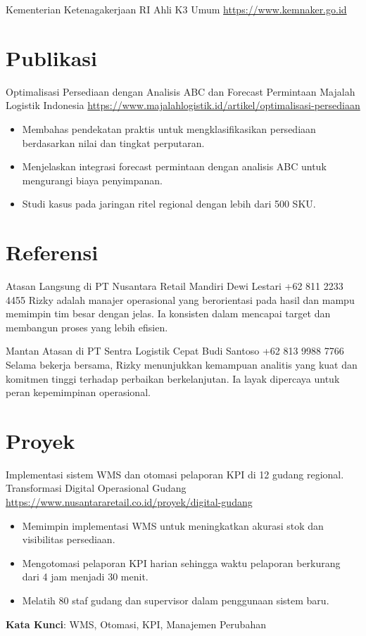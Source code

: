 \documentclass[a4paper, serif, 10pt]{moderncv}
\begin{document}
        {Kementerian Ketenagakerjaan RI}
        {Ahli K3 Umum}
        {\url{https://www.kemnaker.go.id}}
        {}
        {}
\section{Publikasi}

        {Optimalisasi Persediaan dengan Analisis ABC dan Forecast Permintaan}
        {Majalah Logistik Indonesia}
        {\url{https://www.majalahlogistik.id/artikel/optimalisasi-persediaan}}
        {}
        {\begin{itemize}
\item Membahas pendekatan praktis untuk mengklasifikasikan persediaan berdasarkan nilai dan tingkat perputaran.
\item Menjelaskan integrasi forecast permintaan dengan analisis ABC untuk mengurangi biaya penyimpanan.
\item Studi kasus pada jaringan ritel regional dengan lebih dari 500 SKU.
\end{itemize}}
\section{Referensi}

        {Atasan Langsung di PT Nusantara Retail Mandiri}
        {Dewi Lestari}
        {+62 811 2233 4455}
        {}
        {Rizky adalah manajer operasional yang berorientasi pada hasil dan mampu memimpin tim besar dengan jelas. Ia konsisten dalam mencapai target dan membangun proses yang lebih efisien.}

        {Mantan Atasan di PT Sentra Logistik Cepat}
        {Budi Santoso}
        {+62 813 9988 7766}
        {}
        {Selama bekerja bersama, Rizky menunjukkan kemampuan analitis yang kuat dan komitmen tinggi terhadap perbaikan berkelanjutan. Ia layak dipercaya untuk peran kepemimpinan operasional.}
\section{Proyek}

        {Implementasi sistem WMS dan otomasi pelaporan KPI di 12 gudang regional.}
        {Transformasi Digital Operasional Gudang}
        {\url{https://www.nusantararetail.co.id/proyek/digital-gudang}}
        {}
        {\begin{itemize}
\item Memimpin implementasi WMS untuk meningkatkan akurasi stok dan visibilitas persediaan.
\item Mengotomasi pelaporan KPI harian sehingga waktu pelaporan berkurang dari 4 jam menjadi 30 menit.
\item Melatih 80 staf gudang dan supervisor dalam penggunaan sistem baru.
\end{itemize}
\textbf{Kata Kunci}: WMS, Otomasi, KPI, Manajemen Perubahan}
\end{document}
